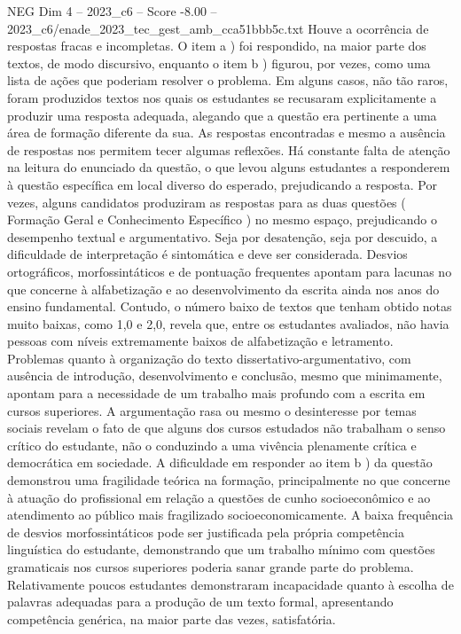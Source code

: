 \begin{textsample}{NEG Dim 4 – 2023\_c6 – Score -8.00 – 2023\_c6/enade\_2023\_tec\_gest\_amb\_cca51bbb5c.txt}
Houve a ocorrência de respostas fracas e incompletas.
O item a ) foi respondido, na maior parte dos textos, de modo discursivo, enquanto o item b ) figurou, por vezes, como uma lista de ações que poderiam resolver o problema.
Em alguns casos, não tão raros, foram produzidos textos nos quais os estudantes se recusaram explicitamente a produzir uma resposta adequada, alegando que a questão era pertinente a uma área de formação diferente da sua.
As respostas encontradas e mesmo a ausência de respostas nos permitem tecer algumas reflexões.
Há constante falta de atenção na leitura do enunciado da questão, o que levou alguns estudantes a responderem à questão específica em local diverso do esperado, prejudicando a resposta.
Por vezes, alguns candidatos produziram as respostas para as duas questões ( Formação Geral e Conhecimento Específico ) no mesmo espaço, prejudicando o desempenho textual e argumentativo.
Seja por desatenção, seja por descuido, a dificuldade de interpretação é sintomática e deve ser considerada.
Desvios ortográficos, morfossintáticos e de pontuação frequentes apontam para lacunas no que concerne à alfabetização e ao desenvolvimento da escrita ainda nos anos do ensino fundamental.
Contudo, o número baixo de textos que tenham obtido notas muito baixas, como 1,0 e 2,0, revela que, entre os estudantes avaliados, não havia pessoas com níveis extremamente baixos de alfabetização e letramento.
Problemas quanto à organização do texto dissertativo-argumentativo, com ausência de introdução, desenvolvimento e conclusão, mesmo que minimamente, apontam para a necessidade de um trabalho mais profundo com a escrita em cursos superiores.
A argumentação rasa ou mesmo o desinteresse por temas sociais revelam o fato de que alguns dos cursos estudados não trabalham o senso crítico do estudante, não o conduzindo a uma vivência plenamente crítica e democrática em sociedade.
A dificuldade em responder ao item b ) da questão demonstrou uma fragilidade teórica na formação, principalmente no que concerne à atuação do profissional em relação a questões de cunho socioeconômico e ao atendimento ao público mais fragilizado socioeconomicamente.
A baixa frequência de desvios morfossintáticos pode ser justificada pela própria competência linguística do estudante, demonstrando que um trabalho mínimo com questões gramaticais nos cursos superiores poderia sanar grande parte do problema.
Relativamente poucos estudantes demonstraram incapacidade quanto à escolha de palavras adequadas para a produção de um texto formal, apresentando competência genérica, na maior parte das vezes, satisfatória.

\end{textsample}

